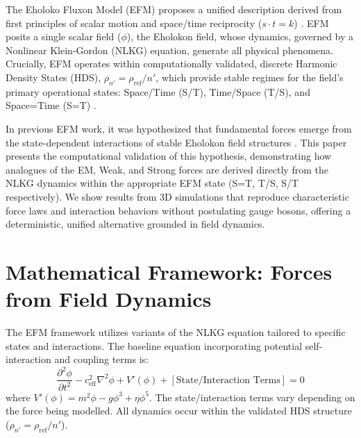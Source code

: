\documentclass[11pt]{article}
\begin{document}
The Eholoko Fluxon Model (EFM) proposes a unified description derived from first principles of scalar motion and space/time reciprocity (\(s \cdot t = k\)) \citep{larson1959, emvula2025compendium_intro_oct}. EFM posits a single scalar field (\(\phi\)), the Eholokon field, whose dynamics, governed by a Nonlinear Klein-Gordon (NLKG) equation, generate all physical phenomena. Crucially, EFM operates within computationally validated, discrete Harmonic Density States (HDS), \(\rho_{n'} = \rho_{\text{ref}}/n'\), which provide stable regimes for the field's primary operational states: Space/Time (S/T), Time/Space (T/S), and Space=Time (S=T) \citep{emvula2025efm_hds_validation_paper}.

In previous EFM work, it was hypothesized that fundamental forces emerge from the state-dependent interactions of stable Eholokon field structures \citep{emvula2025origin_particles_forces}. This paper presents the computational validation of this hypothesis, demonstrating how analogues of the EM, Weak, and Strong forces are derived directly from the NLKG dynamics within the appropriate EFM state (S=T, T/S, S/T respectively). We show results from 3D simulations that reproduce characteristic force laws and interaction behaviors without postulating gauge bosons, offering a deterministic, unified alternative grounded in field dynamics.

\section{Mathematical Framework: Forces from Field Dynamics}
The EFM framework utilizes variants of the NLKG equation tailored to specific states and interactions. The baseline equation incorporating potential self-interaction and coupling terms is:
\begin{equation}
\frac{\partial^2 \phi}{\partial t^2} - c_{\text{eff}}^2 \nabla^2 \phi + V'(\phi) + [\text{State/Interaction Terms}] = 0
\label{eq:nlkg_general}
\end{equation}
where \(V'(\phi) = m^2 \phi - g \phi^3 + \eta \phi^5\). The state/interaction terms vary depending on the force being modelled. All dynamics occur within the validated HDS structure (\(\rho_{n'} = \rho_{\text{ref}}/n'\)).
\end{document}
